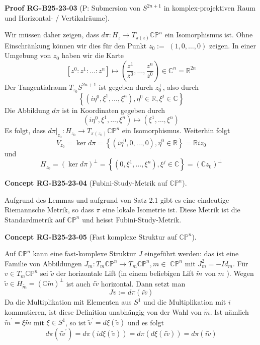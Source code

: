 \documentclass[10pt, letterpaper]{article}
\newcommand{\CustomHeading}[3]{%
  \par\medskip\noindent%
  \textbf{#1 #2} \textnormal{(#3)}.\enskip%
}
\newenvironment{CONC}[2]{\begin{unitbox}\CustomHeading{Concept}{#1}{#2}}{\end{unitbox}}
\newenvironment{PROOF}[2]{\begin{unitbox}\CustomHeading{Proof}{#1}{#2}}{\end{unitbox}}
\begin{document}
\begin{PROOF}{RG-B25-23-03}{P: Submersion von $S^{2n+1}$ in komplex-projektiven Raum und Horizontal- / Vertikalräume}
Wir müssen daher zeigen, dass $d \pi: H_{z} \rightarrow T_{\pi(z)} \mathbb{C P}^{n}$ ein Isomorphismus ist. Ohne Einschränkung können wir dies für den Punkt $z_{0}:=$ $(1,0, \ldots, 0)$ zeigen. In einer Umgebung von $z_{0}$ haben wir die Karte
$$
\left[z^{0}: z^{1}: \ldots: z^{n}\right] \mapsto\left(\frac{z^{1}}{z^{0}}, \ldots, \frac{z^{n}}{z^{0}}\right) \in \mathbb{C}^{n}=\mathbb{R}^{2 n}
$$
Der Tangentialraum $T_{z_{0}} S^{2 n+1}$ ist gegeben durch $z_{0}^{\perp}$, also durch
$$
\left\{\left(i \eta^{0}, \xi^{1}, \ldots, \xi^{n}\right), \eta^{0} \in \mathbb{R}, \xi^{j} \in \mathbb{C}\right\}
$$
Die Abbildung $d \pi$ ist in Koordinaten gegeben durch
$$
\left(i \eta^{0}, \xi^{1}, \ldots, \xi^{n}\right) \mapsto\left(\xi^{1}, \ldots, \xi^{n}\right)
$$
Es folgt, dass $\left.d \pi\right|_{z_{0}}: H_{z_{0}} \rightarrow T_{\pi\left(z_{0}\right)} \mathbb{C} \mathbb{P}^{n}$ ein Isomorphismus. Weiterhin folgt
$$
V_{z_{0}}=\operatorname{ker} d \pi=\left\{\left(i \eta^{0}, 0, \ldots, 0\right), \eta^{0} \in \mathbb{R}\right\}=\mathbb{R} i z_{0}
$$
und
$$
H_{z_{0}}=(\operatorname{ker} d \pi)^{\perp}=\left\{\left(0, \xi^{1}, \ldots, \xi^{n}\right), \xi^{j} \in \mathbb{C}\right\}=\left(\mathbb{C} z_{0}\right)^{\perp}
$$
\end{PROOF}



\begin{CONC}{RG-B25-23-04}{Fubini-Study-Metrik auf $\mathbb{C P}^{n}$}
Aufgrund des Lemmas und aufgrund von Satz 2.1 gibt es eine eindeutige Riemannsche Metrik, so dass $\pi$ eine lokale Isometrie ist. Diese Metrik ist die Standardmetrik auf $\mathbb{C P}^{n}$ und heisst Fubini-Study-Metrik.
\end{CONC}

\begin{CONC}{RG-B25-23-05}{Fast komplexe Struktur auf $\mathbb{C P}^{n}$}
Auf $\mathbb{C P}^{n}$ kann eine fast-komplexe Struktur $J$ eingeführt werden: das ist eine Familie von Abbildungen $J_{m}: T_{m} \mathbb{C P}^{n} \rightarrow T_{m} \mathbb{C P}^{n}, m \in$ $\mathbb{C P}^{n}$ mit $J_{m}^{2}=-I d_{m}$. Für $v \in T_{m} \mathbb{C P}^{n}$ sei $\tilde{v}$ der horizontale Lift (in einem beliebigen Lift $\tilde{m}$ von $m$ ). Wegen $\tilde{v} \in H_{\tilde{m}}=(\mathbb{C} \tilde{m})^{\perp}$ ist auch $i \tilde{v}$ horizontal. Dann setzt man
$$
J v:=d \pi(i \tilde{v})
$$
Da die Multiplikation mit Elementen aus $S^{1}$ und die Multiplikation mit $i$ kommutieren, ist diese Definition unabhängig von der Wahl von $\tilde{m}$. Ist nämlich $\tilde{m}^{\prime}=\xi \tilde{m}$ mit $\xi \in S^{1}$, so ist $\tilde{v}^{\prime}=d \xi(\tilde{v})$ und es folgt
$$
d \pi\left(i \tilde{v}^{\prime}\right)=d \pi(i d \xi(\tilde{v}))=d \pi(d \xi(i \tilde{v}))=d \pi(i \tilde{v})
$$
\end{CONC}
\end{document}
